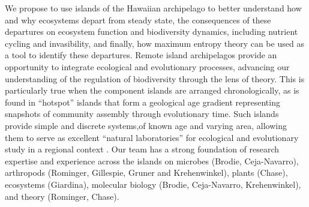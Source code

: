 \documentclass[11pt]{article}
\begin{document}
We propose to use islands of the Hawaiian archipelago to better
understand how and why ecosystems depart from steady state, the
consequences of these departures on ecosystem function and
biodiversity dynamics, including nutrient cycling and invasibility,
and finally, how maximum entropy theory can be used as a tool to
identify these departures.  Remote island archipelagos provide an
opportunity to integrate ecological and evolutionary processes,
advancing our understanding of the regulation of biodiversity through
the lens of theory.  This is particularly true when the component
islands are arranged chronologically, as is found in ``hotspot''
islands that form a geological age gradient representing snapshots of
community assembly through evolutionary time. Such islands provide
simple and discrete systems,of known age and varying area, allowing
them to serve as excellent ``natural laboratories'' for ecological and
evolutionary study in a regional context \citep{simon1987,
  chadwick1999, gillespieClague2009}. Our team has a strong foundation
of research expertise and experience across the islands on microbes
(Brodie, Ceja-Navarro), arthropods (Rominger, Gillespie, Gruner and
Krehenwinkel), plants (Chase), ecosystems (Giardina), molecular
biology (Brodie, Ceja-Navarro, Krehenwinkel), and theory (Rominger,
Chase).
\end{document}

